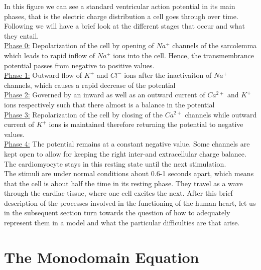 \documentclass[../draft_1.tex]{subfiles}
\begin{document}
In this figure we can see a standard ventricular action potential in its main phases, that is the electric charge distribution a cell goes through over time. Following \cite{franzone2014mathematical} we will have a brief look at the different stages that occur and what they entail.
\smallskip
\\
\underline{Phase 0:} Depolarization of the cell by opening of $Na^+$ channels of the sarcolemma which leads to rapid inflow of $Na^+$ ions into the cell. Hence, the transmembrance potential passes from negative to positive values. \\
\underline{Phase 1:} Outward flow of $K^+$ and $Cl^-$ ions after the inactivaiton of $Na^+$ channels, which causes a rapid decrease of the potential \\
\underline{Phase 2:} Governed by an inward as well as an outward current of $Ca^{2+}$ and $K^+$ ions respectively such that there almost is a balance in the potential \\
\underline{Phase 3:} Repolarization of the cell by closing of the $Ca^{2+}$ channels while outward current of $K^+$ ions is maintained therefore returning the potential to negative values. \\
\underline{Phase 4:} The potential remains at a constant negative value. Some channels are kept open to allow for keeping the right inter-and extracellular charge balance. The cardiomyocyte stays in this resting state until the next stimulation. 
\smallskip
\\
The stimuli are under normal conditions about 0.6-1 seconds apart, which means that the cell is about half the time in its resting phase. They travel as a wave through the cardiac tissue, where one cell excites the next. After this brief description of the processes involved in the functioning of the human heart, let us in the subsequent section turn towards the question of how to adequately represent them in a model and what the particular difficulties are that arise.


\section{The Monodomain Equation}
\end{document}
